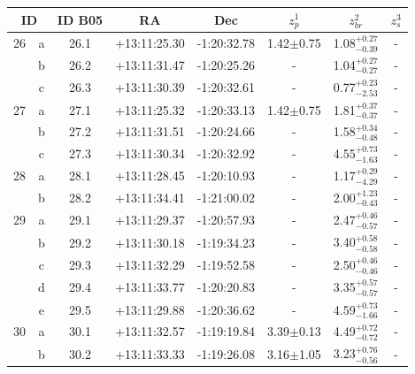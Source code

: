 \documentclass[useAMS,usenatbib]{mn2e}
\begin{document}
\begin{table}
  \centering
  \begin{tabular}{cccccccc}
    \hline
    \multicolumn{2}{c}{ID} & ID B05 & RA & Dec & $z_p^1$ & $z_{br}^2$ & $z_s^3$ \\
    \hline
    \hline
       26 & a & 26.1 & +13:11:25.30 & -1:20:32.78 & 1.42$\pm$0.75 & 1.08$^{+0.27}_{-0.39}$ &       -      \\
          & b & 26.2 & +13:11:31.47 & -1:20:25.26 &      -        & 1.04$^{+0.27}_{-0.27}$ &       -      \\
          & c & 26.3 & +13:11:30.39 & -1:20:32.61 &      -        & 0.77$^{+0.23}_{-2.53}$ &       -      \\
     \hline							    		    	    				
       27 & a & 27.1 & +13:11:25.32 & -1:20:33.13 & 1.42$\pm$0.75 & 1.81$^{+0.37}_{-0.37}$ &       -      \\
          & b & 27.2 & +13:11:31.51 & -1:20:24.66 &      -        & 1.58$^{+0.34}_{-0.48}$ &       -      \\
          & c & 27.3 & +13:11:30.34 & -1:20:32.92 &      -        & 4.55$^{+0.73}_{-1.63}$ &       -      \\
     \hline							    		    	    				
       28 & a & 28.1 & +13:11:28.45 & -1:20:10.93 &      -        & 1.17$^{+0.29}_{-4.29}$ &       -      \\
          & b & 28.2 & +13:11:34.41 & -1:21:00.02 &      -        & 2.00$^{+1.23}_{-0.43}$ &       -      \\
     \hline							    		    	    				
       29 & a & 29.1 & +13:11:29.37 & -1:20:57.93 &      -        & 2.47$^{+0.46}_{-0.57}$ &       -      \\
          & b & 29.2 & +13:11:30.18 & -1:19:34.23 &      -        & 3.40$^{+0.58}_{-0.58}$ &       -      \\
          & c & 29.3 & +13:11:32.29 & -1:19:52.58 &      -        & 2.50$^{+0.46}_{-0.46}$ &       -      \\
          & d & 29.4 & +13:11:33.77 & -1:20:20.83 &      -        & 3.35$^{+0.57}_{-0.57}$ &       -      \\
          & e & 29.5 & +13:11:29.88 & -1:20:36.62 &      -        & 4.59$^{+0.73}_{-1.66}$ &       -      \\
     \hline							    		    	    				
       30 & a & 30.1 & +13:11:32.57 & -1:19:19.84 & 3.39$\pm$0.13 & 4.49$^{+0.72}_{-0.72}$ &       -      \\
          & b & 30.2 & +13:11:33.33 & -1:19:26.08 & 3.16$\pm$1.05 & 3.23$^{+0.76}_{-0.56}$ &       -      \\

\end{tabular}
\end{table}
\end{document}
